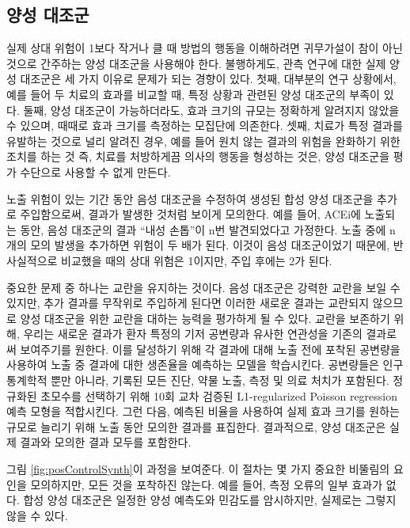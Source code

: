 \documentclass[11pt]{book}
\theoremstyle{definition}
\theoremstyle{definition}
\theoremstyle{definition}
\theoremstyle{remark}
\begin{document}
\subsection{양성 대조군}\label{PositiveControls}


실제 상대 위험이 1보다 작거나 클 때 방법의 행동을 이해하려면 귀무가설이
참이 아닌 것으로 간주하는 양성 대조군을 사용해야 한다. 불행하게도, 관측
연구에 대한 실제 양성 대조군은 세 가지 이유로 문제가 되는 경향이 있다.
첫째, 대부분의 연구 상황에서, 예를 들어 두 치료의 효과를 비교할 때, 특정
상황과 관련된 양성 대조군의 부족이 있다. 둘째, 양성 대조군이
가능하더라도, 효과 크기의 규모는 정확하게 알려지지 않았을 수 있으며,
때때로 효과 크기를 측정하는 모집단에 의존한다. 셋째, 치료가 특정 결과를
유발하는 것으로 널리 알려진 경우, 예를 들어 원치 않는 결과의 위험을
완화하기 위한 조치를 하는 것 즉, 치료를 처방하게끔 의사의 행동을
형성하는 것은, 양성 대조군을 평가 수단으로 사용할 수 없게 만든다.
\citep{noren_2014}


노출 위험이 있는 기간 동안 음성 대조군을 수정하여 생성된 합성 양성
대조군을 추가로 주입함으로써, \citep{schuemie_2018} 결과가 발생한 것처럼
보이게 모의한다. 예를 들어, ACEi에 노출되는 동안, 음성 대조군의 결과
``내성 손톱''이 n번 발견되었다고 가정한다. 노출 중에 n 개의 모의 발생을
추가하면 위험이 두 배가 된다. 이것이 음성 대조군이었기 때문에, 반
사실적으로 비교했을 때의 상대 위험은 1이지만, 주입 후에는 2가 된다.

중요한 문제 중 하나는 교란을 유지하는 것이다. 음성 대조군은 강력한
교란을 보일 수 있지만, 추가 결과를 무작위로 주입하게 된다면 이러한
새로운 결과는 교란되지 않으므로 양성 대조군을 위한 교란을 대하는 능력을
평가하게 될 수 있다. 교란을 보존하기 위해, 우리는 새로운 결과가 환자
특정의 기저 공변량과 유사한 연관성을 기존의 결과로써 보여주기를 원한다.
이를 달성하기 위해 각 결과에 대해 노출 전에 포착된 공변량을 사용하여
노출 중 결과에 대한 생존율을 예측하는 모델을 학습시킨다. 공변량들은 인구
통계학적 뿐만 아니라, 기록된 모든 진단, 약물 노출, 측정 및 의료 처치가
포함된다. 정규화된 초모수를 선택하기 위해 10회 교차 검증된
L1-regularized Poisson regression \citep{suchard_2013} 예측 모형을
적합시킨다. 그런 다음, 예측된 비율을 사용하여 실제 효과 크기를 원하는
규모로 늘리기 위해 노출 동안 모의한 결과를 표집한다. 결과적으로, 양성
대조군은 실제 결과와 모의한 결과 모두를 포함한다.

그림 \ref{fig:posControlSynth}이 과정을 보여준다. 이 절차는 몇 가지
중요한 비뚤림의 요인을 모의하지만, 모든 것을 포착하진 않는다. 예를 들어,
측정 오류의 일부 효과가 없다. 합성 양성 대조군은 일정한 양성 예측도와
민감도를 암시하지만, 실제로는 그렇지 않을 수 있다.
\end{document}
